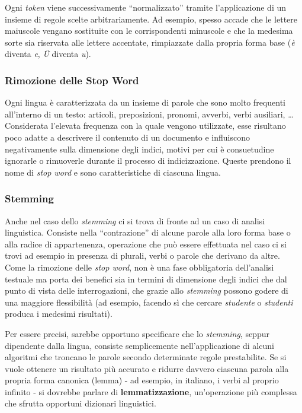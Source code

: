 Ogni \textit{token} viene successivamente “normalizzato” tramite l’applicazione di un insieme di regole scelte arbitrariamente. Ad esempio, spesso accade che le lettere maiuscole vengano sostituite con le corrispondenti minuscole e che la medesima sorte sia riservata alle lettere accentate, rimpiazzate dalla propria forma base (\textit{è} diventa \textit{e}, \textit{Ü} diventa \textit{u}).


\subsubsection{Rimozione delle Stop Word}

Ogni lingua è caratterizzata da un insieme di parole che sono molto frequenti all’interno di un testo: articoli, preposizioni, pronomi, avverbi, verbi ausiliari, … Considerata l’elevata frequenza con la quale vengono utilizzate, esse risultano poco adatte a descrivere il contenuto di un documento e influiscono negativamente sulla dimensione degli indici, motivi per cui è consuetudine ignorarle o rimuoverle durante il processo di indicizzazione. Queste prendono il nome di \textit{stop word} e sono caratteristiche di ciascuna lingua.


\subsubsection{Stemming}
Anche nel caso dello \textit{stemming} ci si trova di fronte ad un caso di analisi linguistica.\newline
Consiste nella “contrazione” di alcune parole alla loro forma base o alla radice di appartenenza, operazione che può essere effettuata nel caso ci si trovi ad esempio in presenza di plurali, verbi o parole che derivano da altre. Come la rimozione delle \textit{stop word}, non è una fase obbligatoria dell’analisi testuale ma porta dei benefici sia in termini di dimensione degli indici che dal punto di vista delle interrogazioni, che grazie allo \textit{stemming} possono godere di una maggiore flessibilità (ad esempio, facendo sì che cercare \textit{studente} o \textit{studenti} produca i medesimi risultati).

Per essere precisi, sarebbe opportuno specificare che lo \textit{stemming}, seppur dipendente dalla lingua, consiste semplicemente nell’applicazione di alcuni algoritmi che troncano le parole secondo determinate regole prestabilite. Se si vuole ottenere un risultato più accurato e ridurre davvero ciascuna parola alla propria forma canonica (lemma) - ad esempio, in italiano, i verbi al proprio infinito - si dovrebbe parlare di \textbf{lemmatizzazione}, un’operazione più complessa che sfrutta opportuni dizionari linguistici.


